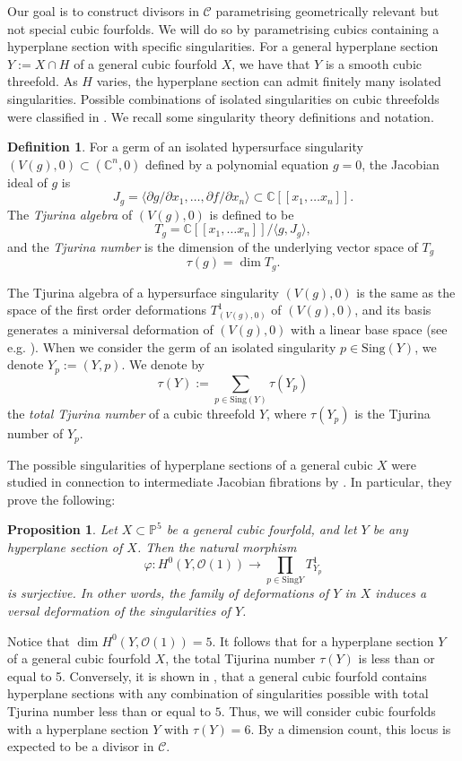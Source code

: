 \documentclass[12pt]{amsart}
\numberwithin{equation}{section}
\theoremstyle{plain}
\newtheorem{proposition}[equation]{Proposition}
\theoremstyle{remark}
\theoremstyle{definition}
\newtheorem{definition}[equation]{Definition}
\newcommand{\bP}{\mathbb{P}}
\newcommand{\bC}{\mathbb{C}}
\newcommand{\calC}{\mathcal{C}}
\newcommand{\calO}{\mathcal{O}}
\newcommand{\Sing}{\mathrm{Sing}}
\begin{document}
Our goal is to construct divisors in $\calC$ parametrising geometrically relevant but not special cubic fourfolds. We will do so by parametrising cubics containing a hyperplane section with specific singularities. For a general hyperplane section $Y:=X\cap H$ of a general cubic fourfold $X$, we have that $Y$ is a smooth cubic threefold.
As $H$ varies, the hyperplane section can admit finitely many isolated singularities. Possible combinations of isolated singularities on cubic threefolds were classified in \cite{viktorova2023classification}. We recall some singularity theory definitions and notation.

\begin{definition}\label{def: Tjurina}
    For a germ of an isolated hypersurface singularity $(V(g),0)\subset (\bC^n,0)$ defined by a polynomial equation $g=0$, the Jacobian ideal of $g$ is
    \[
    J_g=\langle \partial g/\partial x_1,\dots, \partial f/\partial x_n\rangle\subset \bC[[x_1,\dots x_n]].
    \]
    The \textit{Tjurina algebra} of $(V(g),0)$ is defined to be
    \[
    T_g=\bC[[x_1,\dots x_n]]/\langle g,J_g\rangle,
    \]
    and the \textit{Tjurina number} is the dimension of the underlying vector space of $T_g$
    \[
    \tau(g)=\dim T_g.
    \]
\end{definition}
The Tjurina algebra of a hypersurface singularity $(V(g),0)$ is the same as the space of the first order deformations $T^1_{(V(g),0)}$ of $(V(g),0)$, and its basis generates a miniversal deformation of $(V(g),0)$ with a linear base space (see e.g. \cite[Corollary 1.17]{GLS}). When we consider the germ of an isolated singularity $p\in \Sing(Y)$, we denote $Y_p:=(Y,p).$
We denote by 
$$\tau(Y):=\sum_{p\in \Sing(Y)} \tau(Y_p)$$
the \textit{total Tjurina number} of a cubic threefold $Y$, where $\tau(Y_p)$ is the Tjurina number of $Y_p$.

The possible singularities of hyperplane sections of a general cubic $X$ were studied in connection to intermediate Jacobian fibrations by \cite{LSV}. In particular, they prove the following:

\begin{proposition} \cite[Lemma 3.8]{LSV}
    Let $X\subset\bP^5$ be a general cubic fourfold, and let $Y$ be any hyperplane section of $X$. Then the natural morphism
    \[
        \varphi: H^0(Y, \calO(1))\rightarrow \prod_{p\in\Sing  Y} T^1_{Y_p}
    \]
    is surjective. In other words, the family of deformations of $Y$ in $X$ induces a versal deformation of the singularities of $Y$.
\end{proposition}
Notice that $\dim H^0(Y,\calO(1))=5$. It follows that for a hyperplane section $Y$ of a general cubic fourfold $X$, the total Tijurina number $\tau(Y)$ is less than or equal to 5. Conversely, it is shown in \cite{Kazarian}, that a general cubic fourfold contains hyperplane sections with any combination of singularities possible with total Tjurina number less than or equal to $5$. Thus, we will consider cubic fourfolds with a hyperplane section $Y$ with $\tau(Y)=6.$ By a dimension count, this locus is expected to be a divisor in $\calC$.
\end{document}
